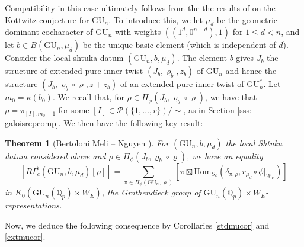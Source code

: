 \documentclass[reqno,11pt]{amsart}
\newtheorem{theorem}{Theorem}[section]
\theoremstyle{remark}
\newcommand{\GU}{\mathrm{GU}}
\newcommand{\mc}{\mathcal}
\begin{document}
Compatibility in this case ultimately follows from the the results of \cite{BMN} on the Kottwitz conjecture for $\GU_{n}$. To introduce this, we let $\mu_{d}$ be the geometric dominant cocharacter of $\GU_n$ with weights $((1^{d},0^{n - d}),1)$ for $1 \leq d < n$, and let $b \in B(\GU_n,\mu_{d})$ be the unique basic element (which is independent of $d$). Consider the local shtuka datum $(\GU_n,b,\mu_{d})$. The element $b$ gives $J_b$ the structure of extended pure inner twist $(J_b, \varrho_b, z_b)$ of $\GU_n$ and hence the structure $(J_b, \varrho_b \circ \varrho, z+z_b)$ of an extended pure inner twist of $\GU^*_n$. Let $m_0 = \kappa(b_0)$. We recall that, for $\rho \in \Pi_{\phi}(J_{b}, \varrho_b \circ \varrho)$, we have that $\rho = \pi_{[I],m_0+1}$ for some $[I] \in \mc{P}(\{1, \dots, r\})/ \sim$, as in Section \ref{sss: galoisrepcomp}. We then have the following key result:
\begin{theorem}[{Bertoloni Meli -- Nguyen \cite[Theorem 6.1]{BMN}}]{\label{hardinput}}
For $(\GU_n,b,\mu_{d})$ the local Shtuka datum considered above and $\rho \in \Pi_{\phi}(J_{b}, \varrho_b \circ \varrho)$, we have an equality
\[ [R\Gamma^{\flat}_{c}(\GU_n,b,\mu_{d})[\rho]] = \sum_{\pi \in \Pi_{\phi}(\GU_n, \varrho)} [\pi \boxtimes \mathrm{Hom}_{S_{\phi}}(\delta_{\pi,\rho},r_{\mu_{d}}\circ \phi|_{W_{E}})]\]
in $K_{0}(\GU_n(\mathbb{Q}_{p}) \times W_{E})$, the Grothendieck group of $\GU_n(\mathbb{Q}_{p}) \times W_{E}$-representations. 
\end{theorem}
Now, we deduce the following consequence by Corollaries \ref{stdmucor} and \ref{extmucor}. 
\end{document}
